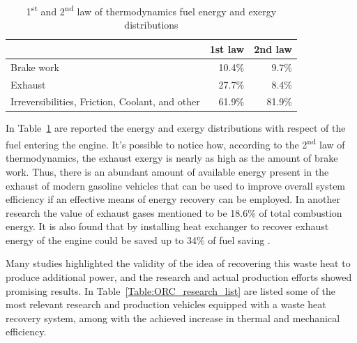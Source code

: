 \begin{table}
  \begin{center}
    \begin{tabular}{lrr}
      & 1st law & 2nd law \\
      \hline
      Brake work & 10.4\% & 9.7\% \\
      Exhaust & 27.7\% & 8.4\% \\
      Irreversibilities, Friction, Coolant, and other & 61.9\% & 81.9\% \\
    \end{tabular}
    \caption{1\textsuperscript{st} and 2\textsuperscript{nd} law of thermodynamics fuel energy and exergy distributions}
    \label{table:1st_2nd_law}
  \end{center}
\end{table}

In Table~\ref{table:1st_2nd_law} are reported the energy and exergy distributions with respect of the fuel entering the engine. It's possible to notice how, according to the 2\textsuperscript{nd} law of thermodynamics, the exhaust exergy is nearly as high as the amount of brake work. Thus, there is an abundant amount of available energy present in the exhaust of modern gasoline vehicles that can be used to improve overall system efficiency if an effective means of energy recovery can be employed. In another research \cite{Dolz2012}  the value of exhaust gases mentioned to be 18.6\% of total combustion energy. It is also found that by installing heat exchanger to recover exhaust energy of the engine could be saved up to 34\% of fuel saving \cite{Wang2013}.

Many studies highlighted the validity of the idea of recovering this waste heat to produce additional power, and the research and actual production efforts showed promising results. In Table~\ref{Table:ORC_research_list} are listed some of the most relevant research and production vehicles equipped with a waste heat recovery system, among with the achieved increase in thermal and mechanical efficiency.

